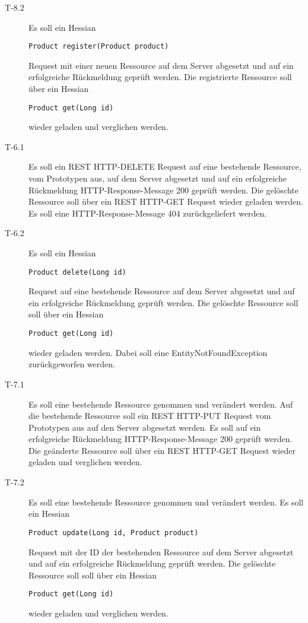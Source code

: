 \documentclass[listof=totocnumbered, bibliography=totocnumbered]{scrreprt}
\begin{document}
\begin{description}
    \item[T-8.2] Es soll ein Hessian 
    \begin{verbatim}Product register(Product product)\end{verbatim}
    Request mit einer neuen Ressource auf dem Server abgesetzt und auf ein
    erfolgreiche Rückmeldung geprüft werden. Die registrierte Ressource soll
    über ein Hessian \begin{verbatim}Product get(Long id)\end{verbatim} wieder
    geladen und verglichen werden.
    
    \item[T-6.1] Es soll ein \ac{REST} HTTP-DELETE Request auf
    eine bestehende Ressource, vom Prototypen aus, auf dem Server abgesetzt und
    auf ein erfolgreiche Rückmeldung HTTP-Response-Message 200 geprüft werden.
    Die gelöschte Ressource soll über ein \ac{REST} HTTP-GET Request wieder
    geladen werden. Es soll eine HTTP-Response-Message 404 zurückgeliefert werden.

    \item[T-6.2] Es soll ein Hessian 
    \begin{verbatim}Product delete(Long id)\end{verbatim}
    Request auf eine bestehende Ressource auf dem Server abgesetzt und auf ein
    erfolgreiche Rückmeldung geprüft werden. Die gelöschte Ressource
    soll soll über ein Hessian 
    \begin{verbatim}Product get(Long id)\end{verbatim} 
    wieder geladen werden. Dabei soll eine EntityNotFoundException
    zurückgeworfen werden.
    
    \item[T-7.1] Es soll eine bestehende Ressource genommen und
    verändert werden. Auf die bestehende Ressource soll ein \ac{REST} HTTP-PUT
    Request vom Prototypen aus auf den Server abgesetzt werden. Es soll auf
    ein erfolgreiche Rückmeldung HTTP-Response-Message 200 geprüft werden. Die
    geänderte Ressource soll über ein \ac{REST} HTTP-GET Request wieder geladen
    und verglichen werden.
        
    \item[T-7.2] Es soll eine bestehende Ressource genommen und
    verändert werden. Es soll ein Hessian 
    \begin{verbatim}Product update(Long id, Product product)\end{verbatim}
    Request mit der ID der bestehenden Ressource auf dem Server abgesetzt und
    auf ein erfolgreiche Rückmeldung geprüft werden. Die gelöschte Ressource
    soll soll über ein Hessian
    \begin{verbatim}Product get(Long id)\end{verbatim} 
    wieder geladen und verglichen werden.
    

\end{description}
\end{document}
